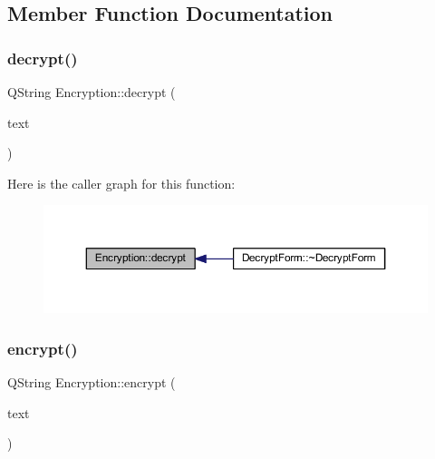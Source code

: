 \subsection{Member Function Documentation}
\hypertarget{class_encryption_aa52a864985f89af118c61a4a3173fd72}{}\label{class_encryption_aa52a864985f89af118c61a4a3173fd72} 
\subsubsection{\texorpdfstring{decrypt()}{decrypt()}}
{\footnotesize\ttfamily Q\+String Encryption\+::decrypt (\begin{DoxyParamCaption}\item[{Q\+String}]{text }\end{DoxyParamCaption})}

Here is the caller graph for this function\+:
\nopagebreak
\begin{figure}[H]
\begin{center}
\leavevmode
\includegraphics[width=350pt]{class_encryption_aa52a864985f89af118c61a4a3173fd72_icgraph}
\end{center}
\end{figure}
\hypertarget{class_encryption_a764237662a4daa19502e6454126fa279}{}\label{class_encryption_a764237662a4daa19502e6454126fa279} 
\subsubsection{\texorpdfstring{encrypt()}{encrypt()}}
{\footnotesize\ttfamily Q\+String Encryption\+::encrypt (\begin{DoxyParamCaption}\item[{Q\+String}]{text }\end{DoxyParamCaption})}

